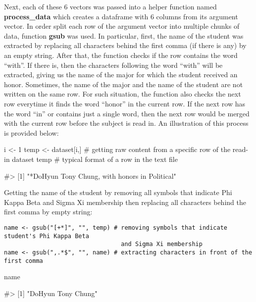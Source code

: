 Next, each of these 6 vectors was passed into a helper function named
\textbf{process\_data} which creates a dataframe with 6 columns from its
argument vector. In order split each row of the argument vector into
multiple chunks of data, function \textbf{gsub} was used. In particular,
first, the name of the student was extracted by replacing all characters
behind the first comma (if there is any) by an empty string. After that,
the function checks if the row contains the word ``with''. If there is,
then the characters following the word ``with'' will be extracted,
giving us the name of the major for which the student received an honor.
Sometimes, the name of the major and the name of the student are not
written on the same row. For such situation, the function also checks
the next row everytime it finds the word ``honor'' in the current row.
If the next row has the word ``in'' or contains just a single word, then
the next row would be merged with the current row before the subject is
read in. An illustration of this process is provided below:

\begin{Schunk}
\begin{Sinput}
i <- 1
temp <- dataset[i,] # getting raw content from a specific row of the read-in dataset
temp # typical format of a row in the text file
\end{Sinput}
\begin{Soutput}
#> [1] "*DoHyun Tony Chung, with honors in Political"
\end{Soutput}
\end{Schunk}

Getting the name of the student by removing all symbols that indicate
Phi Kappa Beta and Sigma Xi membership then replacing all characters
behind the first comma by empty string:

\begin{verbatim}
name <- gsub("[+*]", "", temp) # removing symbols that indicate student's Phi Kappa Beta 
                                 and Sigma Xi membership
name <- gsub(",.*$", "", name) # extracting characters in front of the first comma
\end{verbatim}

\begin{Schunk}
\begin{Sinput}
name
\end{Sinput}
\begin{Soutput}
#> [1] "DoHyun Tony Chung"
\end{Soutput}
\end{Schunk}

